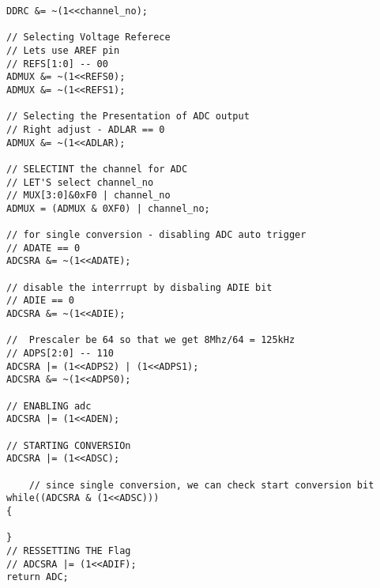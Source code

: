 \begin{verbatim}
DDRC &= ~(1<<channel_no);

// Selecting Voltage Referece
// Lets use AREF pin
// REFS[1:0] -- 00
ADMUX &= ~(1<<REFS0);
ADMUX &= ~(1<<REFS1);

// Selecting the Presentation of ADC output
// Right adjust - ADLAR == 0
ADMUX &= ~(1<<ADLAR);

// SELECTINT the channel for ADC
// LET'S select channel_no
// MUX[3:0]&0xF0 | channel_no
ADMUX = (ADMUX & 0XF0) | channel_no;

// for single conversion - disabling ADC auto trigger
// ADATE == 0
ADCSRA &= ~(1<<ADATE);

// disable the interrrupt by disbaling ADIE bit
// ADIE == 0
ADCSRA &= ~(1<<ADIE);

//  Prescaler be 64 so that we get 8Mhz/64 = 125kHz
// ADPS[2:0] -- 110
ADCSRA |= (1<<ADPS2) | (1<<ADPS1);
ADCSRA &= ~(1<<ADPS0);

// ENABLING adc
ADCSRA |= (1<<ADEN);

// STARTING CONVERSIOn
ADCSRA |= (1<<ADSC);

    // since single conversion, we can check start conversion bit
while((ADCSRA & (1<<ADSC)))
{
    
}
// RESSETTING THE Flag
// ADCSRA |= (1<<ADIF);
return ADC;
\end{verbatim}




